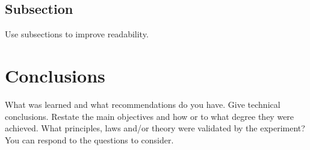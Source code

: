 \documentclass[journal]{IEEEtran}
\begin{document}
\subsection{Subsection}
Use subsections to improve readability.

\section {Conclusions}
What was learned and what recommendations do you have. Give technical conclusions. Restate the main objectives and how or to what degree they were achieved. What principles, laws and/or theory
were validated by the experiment? You can respond to the questions to consider.



\appendix


\end{document}
